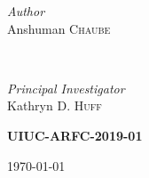 \documentclass[14pt,a4paper]{article} %
\begin{document}
\begin{titlepage}
\begin{minipage}{0.6\textwidth}
        \end{minipage}

    \vspace{0.2cm}
    \HRule
    \vspace{0.5cm}
    
    
    \begin{minipage}{0.4\textwidth}
        \begin{flushleft}
            \large
            \textit{Author}\\
            Anshuman \textsc{Chaube}\\
        \end{flushleft}
    \end{minipage}
    ~
    \begin{minipage}{0.4\textwidth}
        \begin{flushright}
            \large
            \textit{Principal Investigator}\\
            Kathryn D. \textsc{Huff} %
        \end{flushright}
    \end{minipage}
    

    \vspace{1cm}
    \textsc{\LARGE\bfseries UIUC-ARFC-2019-01} %
    \vspace{0.5cm}
    
    
    \vspace{0.5cm} %
    {\large\today} %
    \vspace{0.5cm}

    

\end{titlepage}
\end{document}
